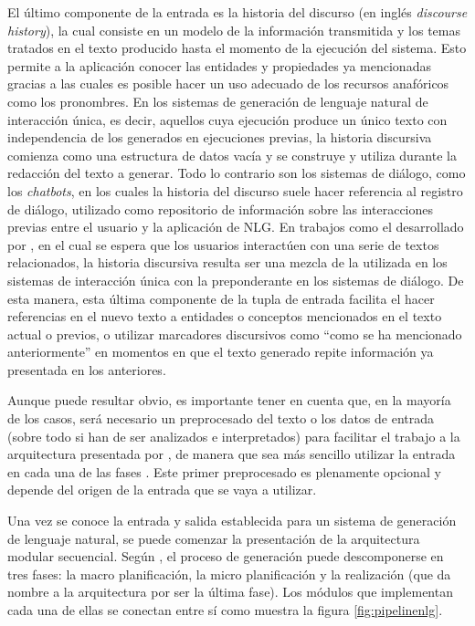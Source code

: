 El último componente de la entrada es la historia del discurso (en inglés \textit{discourse history}), la cual consiste en un modelo de la información transmitida y los temas tratados en el texto producido hasta el momento de la ejecución del sistema. Esto permite a la aplicación conocer las entidades y propiedades ya mencionadas gracias a las cuales es posible hacer un uso adecuado de los recursos anafóricos como los pronombres. En los sistemas de generación de lenguaje natural de interacción única, es decir, aquellos cuya ejecución produce un único texto con independencia de los generados en ejecuciones previas, la historia discursiva comienza como una estructura de datos vacía y se construye y utiliza durante la redacción del texto a generar. Todo lo contrario son los sistemas de diálogo, como los \textit{chatbots}, en los cuales la historia del discurso suele hacer referencia al registro de diálogo, utilizado como repositorio de información sobre las interacciones previas entre el usuario y la aplicación de NLG. En trabajos como el desarrollado por \cite{milosavljevic1996text}, en el cual se espera que los usuarios interactúen con una serie de textos relacionados, la historia discursiva resulta ser una mezcla de la utilizada en los sistemas de interacción única con la preponderante en los sistemas de diálogo. De esta manera, esta última componente de la tupla de entrada facilita el hacer referencias en el nuevo texto a entidades o conceptos mencionados en el texto actual o previos, o utilizar marcadores discursivos como ``como se ha mencionado anteriormente'' en momentos en que el texto generado repite información ya presentada en los anteriores.

Aunque puede resultar obvio, es importante tener en cuenta que, en la mayoría de los casos, será necesario un preprocesado del texto o los datos de entrada (sobre todo si han de ser analizados e interpretados) para facilitar el trabajo a la arquitectura presentada por \cite{biblia}, de manera que sea más sencillo utilizar la entrada en cada una de las fases \citep{han2011data}. Este primer preprocesado es plenamente opcional y depende del origen de la entrada que se vaya a utilizar.

Una vez se conoce la entrada y salida establecida para un sistema de generación de lenguaje natural, se puede comenzar la presentación de la arquitectura modular secuencial. Según \cite{biblia}, el proceso de generación puede descomponerse en tres fases: la macro planificación, la micro planificación y la realización (que da nombre a la arquitectura por ser la última fase). Los módulos que implementan cada una de ellas se conectan entre sí como muestra la figura \ref{fig:pipelinenlg}.


